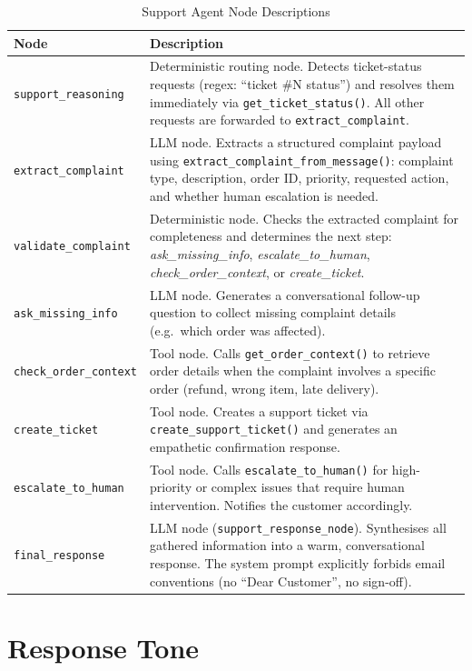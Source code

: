 \documentclass[12pt,a4paper]{report}
\begin{document}
\begin{table}[H]
\centering
\caption{Support Agent Node Descriptions}
\begin{tabularx}{\textwidth}{lX}
\toprule
\textbf{Node} & \textbf{Description} \\
\midrule
\texttt{support\_reasoning}   &
    Deterministic routing node. Detects ticket-status requests (regex: ``ticket \#N status'')
    and resolves them immediately via \texttt{get\_ticket\_status()}. All other requests
    are forwarded to \texttt{extract\_complaint}. \\[0.4em]
\texttt{extract\_complaint}   &
    LLM node. Extracts a structured complaint payload using \texttt{extract\_complaint\_from\_message()}:
    complaint type, description, order ID, priority, requested action, and whether
    human escalation is needed. \\[0.4em]
\texttt{validate\_complaint}  &
    Deterministic node. Checks the extracted complaint for completeness and determines
    the next step: \textit{ask\_missing\_info}, \textit{escalate\_to\_human},
    \textit{check\_order\_context}, or \textit{create\_ticket}. \\[0.4em]
\texttt{ask\_missing\_info}   &
    LLM node. Generates a conversational follow-up question to collect missing complaint
    details (e.g.\ which order was affected). \\[0.4em]
\texttt{check\_order\_context} &
    Tool node. Calls \texttt{get\_order\_context()} to retrieve order details when the
    complaint involves a specific order (refund, wrong item, late delivery). \\[0.4em]
\texttt{create\_ticket}       &
    Tool node. Creates a support ticket via \texttt{create\_support\_ticket()} and
    generates an empathetic confirmation response. \\[0.4em]
\texttt{escalate\_to\_human}  &
    Tool node. Calls \texttt{escalate\_to\_human()} for high-priority or complex issues
    that require human intervention. Notifies the customer accordingly. \\[0.4em]
\texttt{final\_response}      &
    LLM node (\texttt{support\_response\_node}). Synthesises all gathered information
    into a warm, conversational response. The system prompt explicitly forbids
    email conventions (no ``Dear Customer'', no sign-off). \\
\bottomrule
\end{tabularx}
\end{table}

\section{Response Tone}
\end{document}
